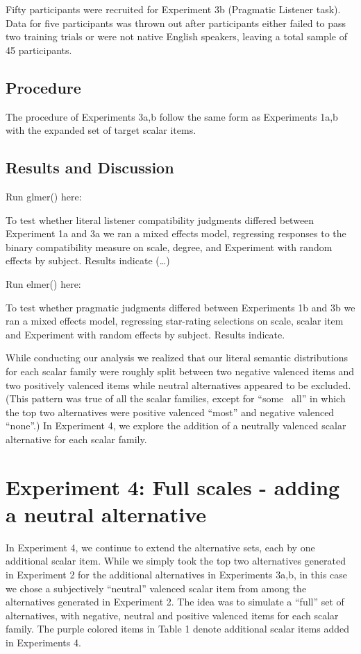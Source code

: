 \documentclass[10pt, letterpaper]{article}
\begin{document}
Fifty participants were recruited for Experiment 3b (Pragmatic Listener
task). Data for five participants was thrown out after participants
either failed to pass two training trials or were not native English
speakers, leaving a total sample of 45 participants.

\subsection{Procedure}\label{procedure}

The procedure of Experiments 3a,b follow the same form as Experiments
1a,b with the expanded set of target scalar items.

\subsection{Results and Discussion}\label{results-and-discussion-2}

Run glmer() here:

To test whether literal listener compatibility judgments differed
between Experiment 1a and 3a we ran a mixed effects model, regressing
responses to the binary compatibility measure on scale, degree, and
Experiment with random effects by subject. Results indicate (\ldots{})

Run elmer() here:

To test whether pragmatic judgments differed between Experiments 1b and
3b we ran a mixed effects model, regressing star-rating selections on
scale, scalar item and Experiment with random effects by subject.
Results indicate.

While conducting our analysis we realized that our literal semantic
distributions for each scalar family were roughly split between two
negative valenced items and two positively valenced items while neutral
alternatives appeared to be excluded. (This pattern was true of all the
scalar families, except for ``some ~all'' in which the top two
alternatives were positive valenced ``most'' and negative valenced
``none''.) In Experiment 4, we explore the addition of a neutrally
valenced scalar alternative for each scalar family.

\section{Experiment 4: Full scales - adding a neutral
alternative}\label{experiment-4-full-scales---adding-a-neutral-alternative}

In Experiment 4, we continue to extend the alternative sets, each by one
additional scalar item. While we simply took the top two alternatives
generated in Experiment 2 for the additional alternatives in Experiments
3a,b, in this case we chose a subjectively ``neutral'' valenced scalar
item from among the alternatives generated in Experiment 2. The idea was
to simulate a ``full'' set of alternatives, with negative, neutral and
positive valenced items for each scalar family. The purple colored items
in Table 1 denote additional scalar items added in Experiments 4.
\end{document}
